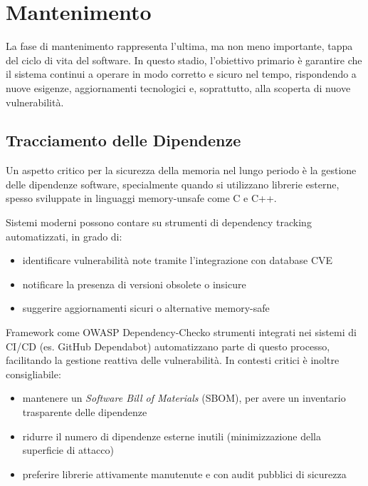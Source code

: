 \section{Mantenimento}
\label{sec:maintenance}

La fase di mantenimento rappresenta l'ultima, ma non meno importante, tappa del ciclo
di vita del software. In questo stadio, l'obiettivo primario è garantire che il sistema
continui a operare in modo corretto e sicuro nel tempo, rispondendo a nuove
esigenze, aggiornamenti tecnologici e, soprattutto, alla scoperta di nuove vulnerabilità.

\subsection{Tracciamento delle Dipendenze}
\label{sec:tracciamento-dipendenze}

Un aspetto critico per la sicurezza della memoria nel lungo periodo è la
gestione delle dipendenze software, specialmente quando si utilizzano librerie esterne,
spesso sviluppate in linguaggi memory-unsafe come C e C++.

Sistemi moderni possono contare su strumenti di dependency tracking
automatizzati, in grado di:
\begin{itemize}
  \item identificare vulnerabilità note tramite l'integrazione con database CVE

  \item notificare la presenza di versioni obsolete o insicure

  \item suggerire aggiornamenti sicuri o alternative memory-safe
\end{itemize}

Framework come OWASP Dependency-Check\footnotemark o strumenti integrati nei sistemi di CI/CD
(es. GitHub Dependabot) automatizzano parte di questo processo, facilitando la gestione
reattiva delle vulnerabilità. In contesti critici è inoltre consigliabile:
\begin{itemize}
  \item mantenere un \textit{Software Bill of Materials} (SBOM), per avere un inventario
    trasparente delle dipendenze

  \item ridurre il numero di dipendenze esterne inutili (minimizzazione
    della superficie di attacco)

  \item preferire librerie attivamente manutenute e con audit pubblici di sicurezza
\end{itemize}

